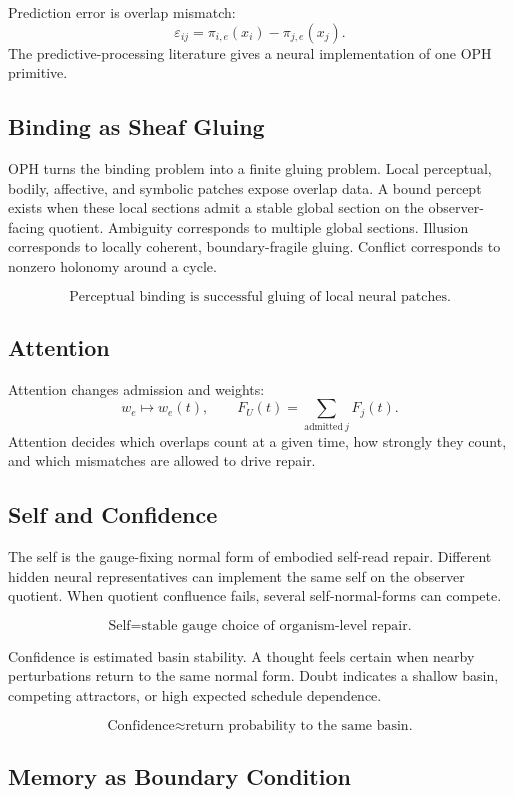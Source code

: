 \documentclass[11pt]{article}
\theoremstyle{remark}
\theoremstyle{plain}
\begin{document}
Prediction error is overlap mismatch:
\[
\varepsilon_{ij}
=
\pi_{i,e}(x_i)-\pi_{j,e}(x_j).
\]
The predictive-processing literature gives a neural implementation of one OPH primitive.

\subsection{Binding as Sheaf Gluing}

OPH turns the binding problem into a finite gluing problem. Local perceptual, bodily, affective, and symbolic patches expose overlap data. A bound percept exists when these local sections admit a stable global section on the observer-facing quotient. Ambiguity corresponds to multiple global sections. Illusion corresponds to locally coherent, boundary-fragile gluing. Conflict corresponds to nonzero holonomy around a cycle.

\[
\boxed{
\text{Perceptual binding is successful gluing of local neural patches.}
}
\]

\subsection{Attention}

Attention changes admission and weights:
\[
w_e\mapsto w_e(t),
\qquad
F_U(t)=\sum_{\mathrm{admitted}\ j}F_j(t).
\]
Attention decides which overlaps count at a given time, how strongly they count, and which mismatches are allowed to drive repair.

\subsection{Self and Confidence}

The self is the gauge-fixing normal form of embodied self-read repair. Different hidden neural representatives can implement the same self on the observer quotient. When quotient confluence fails, several self-normal-forms can compete.

\[
\boxed{
\text{Self}=\text{stable gauge choice of organism-level repair.}
}
\]

Confidence is estimated basin stability. A thought feels certain when nearby perturbations return to the same normal form. Doubt indicates a shallow basin, competing attractors, or high expected schedule dependence.

\[
\boxed{
\text{Confidence}\approx\text{return probability to the same basin.}
}
\]

\subsection{Memory as Boundary Condition}
\end{document}

